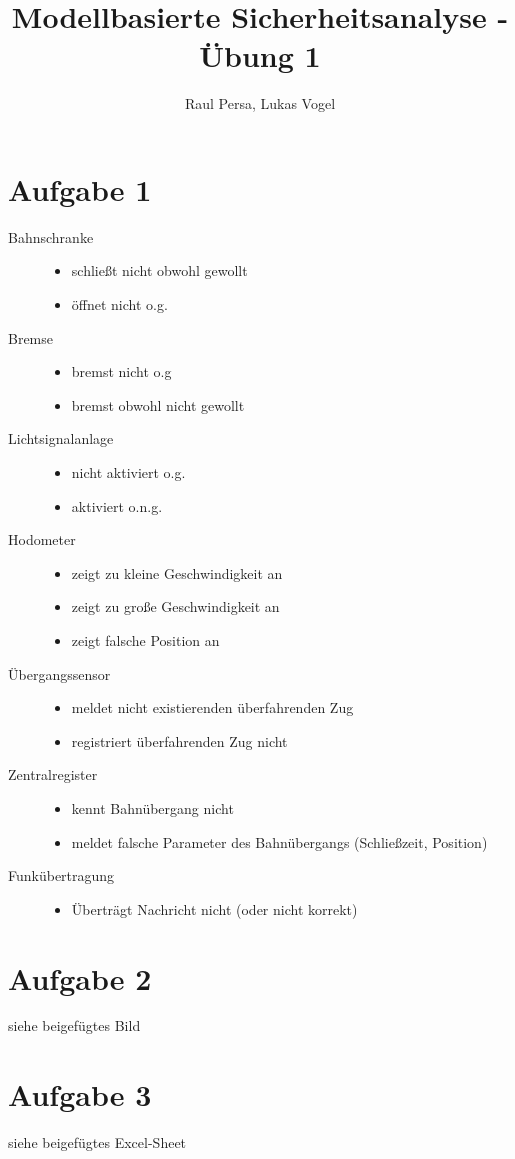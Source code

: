 \documentclass[10pt,a4paper]{article}
\author{Raul Persa, Lukas Vogel}
\title{Modellbasierte Sicherheitsanalyse - Übung 1}
\begin{document}
\maketitle

\section*{Aufgabe 1}

\begin{description}
\item[Bahnschranke] \hfill
\begin{itemize}
\item schließt nicht obwohl gewollt
\item öffnet nicht o.g.
\end{itemize}
\item[Bremse] \hfill
\begin{itemize}
\item bremst nicht o.g
\item bremst obwohl nicht gewollt
\end{itemize}
\item[Lichtsignalanlage] \hfill
\begin{itemize}
\item nicht aktiviert o.g.
\item aktiviert o.n.g.
\end{itemize}
\item[Hodometer] \hfill
\begin{itemize}
\item zeigt zu kleine Geschwindigkeit an
\item zeigt zu große Geschwindigkeit an
\item zeigt falsche Position an
\end{itemize}
\item[Übergangssensor] \hfill
\begin{itemize}
\item meldet nicht existierenden überfahrenden Zug
\item registriert überfahrenden Zug nicht
\end{itemize}
\item[Zentralregister] \hfill
\begin{itemize}
\item kennt Bahnübergang nicht
\item meldet falsche Parameter des Bahnübergangs (Schließzeit, Position)
\end{itemize}
\item[Funkübertragung] \hfill
\begin{itemize}
\item Überträgt Nachricht nicht (oder nicht korrekt)
\end{itemize}
\end{description}

\section*{Aufgabe 2}
siehe beigefügtes Bild

\section*{Aufgabe 3}
siehe beigefügtes Excel-Sheet
\end{document}
